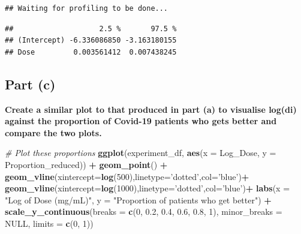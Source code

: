 \documentclass[
]{article}
\newenvironment{Shaded}{\begin{snugshade}}{\end{snugshade}}
\newcommand{\CommentTok}[1]{\textcolor[rgb]{0.56,0.35,0.01}{\textit{#1}}}
\newcommand{\DataTypeTok}[1]{\textcolor[rgb]{0.13,0.29,0.53}{#1}}
\newcommand{\DecValTok}[1]{\textcolor[rgb]{0.00,0.00,0.81}{#1}}
\newcommand{\FloatTok}[1]{\textcolor[rgb]{0.00,0.00,0.81}{#1}}
\newcommand{\KeywordTok}[1]{\textcolor[rgb]{0.13,0.29,0.53}{\textbf{#1}}}
\newcommand{\NormalTok}[1]{#1}
\newcommand{\OperatorTok}[1]{\textcolor[rgb]{0.81,0.36,0.00}{\textbf{#1}}}
\newcommand{\OtherTok}[1]{\textcolor[rgb]{0.56,0.35,0.01}{#1}}
\newcommand{\StringTok}[1]{\textcolor[rgb]{0.31,0.60,0.02}{#1}}
\begin{document}
\begin{verbatim}
## Waiting for profiling to be done...
\end{verbatim}

\begin{verbatim}
##                    2.5 %       97.5 %
## (Intercept) -6.336086850 -3.163180155
## Dose         0.003561412  0.007438245
\end{verbatim}

\hypertarget{part-c-1}{%
\subsection{\texorpdfstring{\textbf{Part
(c)}}{Part (c)}}\label{part-c-1}}

\textbf{Create a similar plot to that produced in part (a) to visualise
log(di) against the proportion of Covid-19 patients who gets better and
compare the two plots.}

\begin{Shaded}
\end{Shaded}

\begin{Shaded}
\begin{Highlighting}[]
\CommentTok{# Plot these proportions}
\KeywordTok{ggplot}\NormalTok{(experiment_df, }\KeywordTok{aes}\NormalTok{(}\DataTypeTok{x =}\NormalTok{ Log_Dose, }\DataTypeTok{y =}\NormalTok{ Proportion_reduced)) }\OperatorTok{+}
\StringTok{ }\KeywordTok{geom_point}\NormalTok{() }\OperatorTok{+}
\StringTok{ }\KeywordTok{geom_vline}\NormalTok{(}\DataTypeTok{xintercept=}\KeywordTok{log}\NormalTok{(}\DecValTok{500}\NormalTok{),}\DataTypeTok{linetype=}\StringTok{'dotted'}\NormalTok{,}\DataTypeTok{col=}\StringTok{'blue'}\NormalTok{)}\OperatorTok{+}
\StringTok{ }\KeywordTok{geom_vline}\NormalTok{(}\DataTypeTok{xintercept=}\KeywordTok{log}\NormalTok{(}\DecValTok{1000}\NormalTok{),}\DataTypeTok{linetype=}\StringTok{'dotted'}\NormalTok{,}\DataTypeTok{col=}\StringTok{'blue'}\NormalTok{)}\OperatorTok{+}
\StringTok{ }\KeywordTok{labs}\NormalTok{(}\DataTypeTok{x =} \StringTok{"Log of Dose (mg/mL)"}\NormalTok{,}
      \DataTypeTok{y =} \StringTok{"Proportion of patients who get better"}\NormalTok{) }\OperatorTok{+}
\StringTok{ }\KeywordTok{scale_y_continuous}\NormalTok{(}\DataTypeTok{breaks =} \KeywordTok{c}\NormalTok{(}\DecValTok{0}\NormalTok{, }\FloatTok{0.2}\NormalTok{, }\FloatTok{0.4}\NormalTok{, }\FloatTok{0.6}\NormalTok{, }\FloatTok{0.8}\NormalTok{, }\DecValTok{1}\NormalTok{),}
                    \DataTypeTok{minor_breaks =} \OtherTok{NULL}\NormalTok{,}
                    \DataTypeTok{limits =} \KeywordTok{c}\NormalTok{(}\DecValTok{0}\NormalTok{, }\DecValTok{1}\NormalTok{))}
\end{Highlighting}
\end{Shaded}
\end{document}
